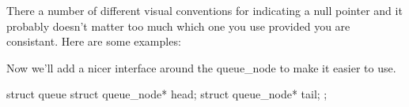
There a number of different visual conventions for indicating a null pointer and it probably doesn't 
matter too much which one you use provided you are consistant. 
Here are some examples:

\begin{center}
\end{center}



Now we'll add a nicer interface around the queue\_node to make it easier to use.

\begin{codeblock}
struct queue {
    struct queue_node* head;
    struct queue_node* tail;
};
\end{codeblock}

